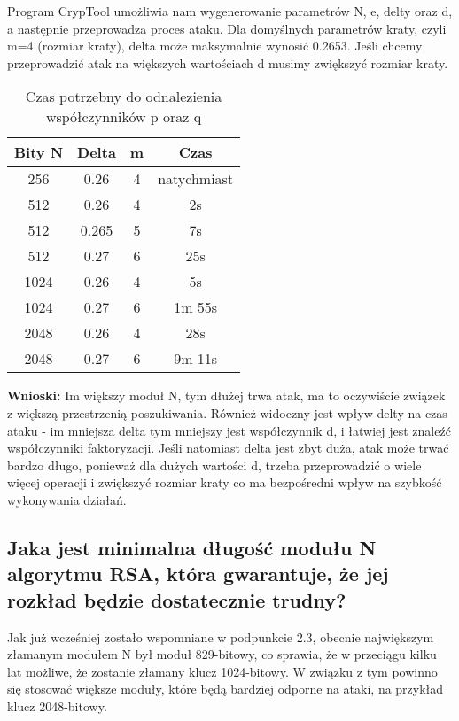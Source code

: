 \documentclass{article}
\begin{document}
Program CrypTool umożliwia nam wygenerowanie parametrów N, e, delty oraz d, a następnie przeprowadza proces ataku. Dla domyślnych parametrów kraty, czyli m=4 (rozmiar kraty), delta może maksymalnie wynosić 0.2653. Jeśli chcemy przeprowadzić atak na większych wartościach d musimy zwiększyć rozmiar kraty.

\begin{table}[H]
    \centering
    \caption{Czas potrzebny do odnalezienia współczynników p oraz q}
    \begin{tabular}{|c|c|c|c|}
        \hline
        \textbf{Bity N} & \textbf{Delta} & \textbf{m} & \textbf{Czas} \\ \hline
        256             & 0.26           & 4          & natychmiast   \\ \hline
        512             & 0.26           & 4          & 2s            \\ \hline
        512             & 0.265          & 5          & 7s            \\ \hline
        512             & 0.27           & 6          & 25s           \\ \hline
        1024            & 0.26           & 4          & 5s            \\ \hline
        1024            & 0.27           & 6          & 1m 55s        \\ \hline
        2048            & 0.26           & 4          & 28s           \\ \hline
        2048            & 0.27           & 6          & 9m 11s        \\ \hline
    \end{tabular}
\end{table}

\textbf{Wnioski: } Im większy moduł N, tym dłużej trwa atak, ma to oczywiście związek z większą przestrzenią poszukiwania. Również widoczny jest wpływ delty na czas ataku - im mniejsza delta tym mniejszy jest współczynnik d, i łatwiej jest znaleźć współczynniki faktoryzacji.
Jeśli natomiast delta jest zbyt duża, atak może trwać bardzo długo, ponieważ dla dużych wartości d, trzeba przeprowadzić o wiele więcej operacji i zwiększyć rozmiar kraty co ma bezpośredni wpływ na szybkość wykonywania działań.

\subsection{Jaka jest minimalna długość modułu N algorytmu RSA, która gwarantuje, że jej rozkład będzie dostatecznie trudny?}
Jak już wcześniej zostało wspomniane w podpunkcie 2.3, obecnie największym złamanym modułem N był moduł 829-bitowy, co sprawia, że w przeciągu kilku lat możliwe, że zostanie złamany klucz 1024-bitowy.
W związku z tym powinno się stosować większe moduły, które będą bardziej odporne na ataki, na przykład klucz 2048-bitowy.
\end{document}
